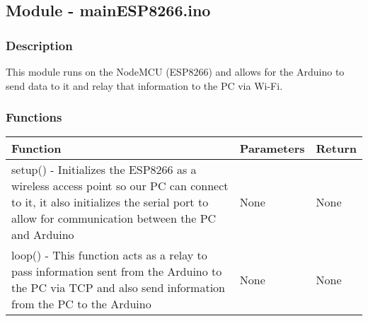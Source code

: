 \documentclass[12pt, titlepage]{article}
\begin{document}
    \subsection{Module - mainESP8266.ino}

    \subsubsection{Description}
    This module runs on the NodeMCU (ESP8266) and allows for the Arduino to send data to it and relay that information to the PC via Wi-Fi.
    

  \subsubsection{Functions}
    \noindent \begin{tabular}{| p{} | p{}| p{}|}
      \hline
      \rowcolor[gray]{0.9}
      Function & Parameters & Return\\
      \hline
      setup() - Initializes the ESP8266 as a wireless access point so our PC can connect to it, it also initializes the serial port to allow for communication between the PC and Arduino & None & None \\
      \hline
      loop() - This function acts as a relay to pass information sent from the Arduino to the PC via TCP and also send information from the PC to the Arduino & None & None \\
      \hline
      
    \end{tabular}




\newpage



\newpage

\end{document}
